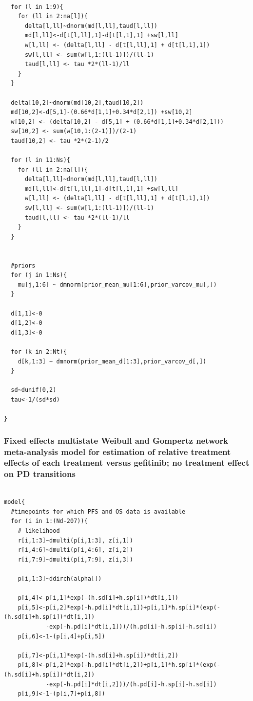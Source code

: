 \documentclass[11pt,final,fleqn]{article}\usepackage[]{graphicx}\usepackage[]{color}
\theoremstyle{plain}
\begin{document}
\begin{appendices}
\begin{verbatim}
  
  for (l in 1:9){
    for (ll in 2:na[l]){
      delta[l,ll]~dnorm(md[l,ll],taud[l,ll])
      md[l,ll]<-d[t[l,ll],1]-d[t[l,1],1] +sw[l,ll]
      w[l,ll] <- (delta[l,ll] - d[t[l,ll],1] + d[t[l,1],1])
      sw[l,ll] <- sum(w[l,1:(ll-1)])/(ll-1) 
      taud[l,ll] <- tau *2*(ll-1)/ll 
    }
  }
  
  delta[10,2]~dnorm(md[10,2],taud[10,2])
  md[10,2]<-d[5,1]-(0.66*d[1,1]+0.34*d[2,1]) +sw[10,2]
  w[10,2] <- (delta[10,2] - d[5,1] + (0.66*d[1,1]+0.34*d[2,1]))
  sw[10,2] <- sum(w[10,1:(2-1)])/(2-1) 
  taud[10,2] <- tau *2*(2-1)/2 
  
  for (l in 11:Ns){
    for (ll in 2:na[l]){
      delta[l,ll]~dnorm(md[l,ll],taud[l,ll])
      md[l,ll]<-d[t[l,ll],1]-d[t[l,1],1] +sw[l,ll]
      w[l,ll] <- (delta[l,ll] - d[t[l,ll],1] + d[t[l,1],1])
      sw[l,ll] <- sum(w[l,1:(ll-1)])/(ll-1) 
      taud[l,ll] <- tau *2*(ll-1)/ll 
    }
  }
  
  
  #priors
  for (j in 1:Ns){
    mu[j,1:6] ~ dmnorm(prior_mean_mu[1:6],prior_varcov_mu[,]) 
  }
  
  d[1,1]<-0
  d[1,2]<-0
  d[1,3]<-0

  for (k in 2:Nt){
    d[k,1:3] ~ dmnorm(prior_mean_d[1:3],prior_varcov_d[,]) 
  }
  
  sd~dunif(0,2)
  tau<-1/(sd*sd)
  
}

\end{verbatim}

\subsubsection{Fixed effects multistate Weibull and Gompertz network meta-analysis model for estimation of relative treatment effects of each treatment versus gefitinib; no treatment effect on PD transitions}
\begin{verbatim} 

model{
  #timepoints for which PFS and OS data is available
  for (i in 1:(Nd-207)){
    # likelihood
    r[i,1:3]~dmulti(p[i,1:3], z[i,1]) 
    r[i,4:6]~dmulti(p[i,4:6], z[i,2]) 
    r[i,7:9]~dmulti(p[i,7:9], z[i,3]) 
    
    p[i,1:3]~ddirch(alpha[])
    
    p[i,4]<-p[i,1]*exp(-(h.sd[i]+h.sp[i])*dt[i,1])
    p[i,5]<-p[i,2]*exp(-h.pd[i]*dt[i,1])+p[i,1]*h.sp[i]*(exp(-(h.sd[i]+h.sp[i])*dt[i,1])
    		-exp(-h.pd[i]*dt[i,1]))/(h.pd[i]-h.sp[i]-h.sd[i])
    p[i,6]<-1-(p[i,4]+p[i,5])
    
    p[i,7]<-p[i,1]*exp(-(h.sd[i]+h.sp[i])*dt[i,2])
    p[i,8]<-p[i,2]*exp(-h.pd[i]*dt[i,2])+p[i,1]*h.sp[i]*(exp(-(h.sd[i]+h.sp[i])*dt[i,2])
    		-exp(-h.pd[i]*dt[i,2]))/(h.pd[i]-h.sp[i]-h.sd[i])
    p[i,9]<-1-(p[i,7]+p[i,8])
    

\end{verbatim}
\end{appendices}
\end{document}
